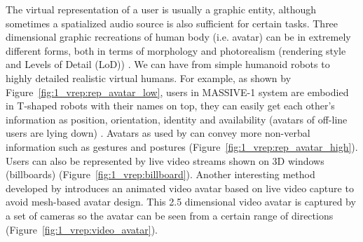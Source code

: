 The virtual representation of a user is usually a graphic entity, although sometimes a spatialized audio source is also sufficient for certain tasks. Three dimensional graphic recreations of human body (i.e. avatar) can be in extremely different forms, both in terms of morphology and photorealism (rendering style and Levels of Detail (LoD)) \citep{Garau2006Fidelity}. We can have from simple humanoid robots to highly detailed realistic virtual humans. For example, as shown by Figure~\ref{fig:1_vrep:rep_avatar_low}, users in MASSIVE-1 system are embodied in T-shaped robots with their names on top, they can easily get each other's information as position, orientation, identity and availability (avatars of off-line users are lying down) \citep{Greenhalgh1995MASSIVE}. Avatars as used by \citet{Roberts2004SSH} can convey more non-verbal information such as gestures and postures (Figure~\ref{fig:1_vrep:rep_avatar_high}). Users can also be represented by live video streams shown on 3D windows (billboards) \citep{Hayashi2007Immersive} (Figure~\ref{fig:1_vrep:billboard}). Another interesting method developed by \citet{Ogi2001SteAva} introduces an animated video avatar based on live video capture to avoid mesh-based avatar design. This 2.5 dimensional video avatar is captured by a set of cameras so the avatar can be seen from a certain range of directions (Figure~\ref{fig:1_vrep:video_avatar}).

